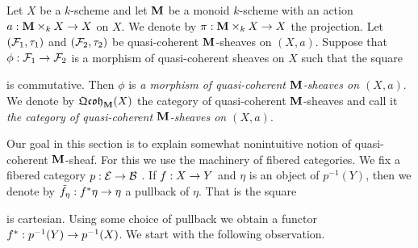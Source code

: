 \begin{definition}
Let $X$ be a $k$-scheme and let $\mathbf{M}$ be a monoid $k$-scheme with an action $a:\mathbf{M}\times_kX\rightarrow X$ on $X$. We denote by $\pi:\mathbf{M}\times_kX\rightarrow X$ the projection. Let $({\mathcal F}_1,\tau_1)$ and $({\mathcal F}_2,\tau_2)$ be quasi-coherent $\mathbf{M}$-sheaves on $(X,a)$. Suppose that $\phi:{\mathcal F}_1\rightarrow {\mathcal F}_2$ is a morphism of quasi-coherent sheaves on $X$ such that the square
\begin{center}
\end{center}
is commutative. Then $\phi$ is \textit{a morphism of quasi-coherent $\mathbf{M}$-sheaves on $(X,a)$}. We denote by $\mathfrak{Qcoh}_{\mathbf{M}}(X)$ the category of quasi-coherent $\mathbf{M}$-sheaves and call it \textit{the category of quasi-coherent $\mathbf{M}$-sheaves on $(X,a)$}.
\end{definition}
\noindent
Our goal in this section is to explain somewhat nonintuitive notion of quasi-coherent $\mathbf{M}$-sheaf. For this we use the machinery of fibered categories. We fix a fibered category $p:{\mathcal E} \rightarrow {\mathcal B}$ . If $f:X\rightarrow Y$ and $\eta$ is an object of $p^{-1}(Y)$, then we denote by $\tilde{f}_{\eta}:f^*\eta\rightarrow \eta$ a pullback of $\eta$. That is the square
\begin{center}
\end{center}
is cartesian. Using some choice of pullback we obtain a functor $f^*:p^{-1}(Y)\rightarrow p^{-1}(X)$. We start with the following observation.

